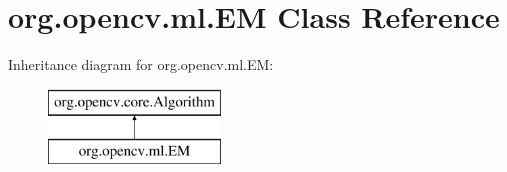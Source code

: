 \hypertarget{classorg_1_1opencv_1_1ml_1_1_e_m}{}\section{org.\+opencv.\+ml.\+EM Class Reference}
\label{classorg_1_1opencv_1_1ml_1_1_e_m}
Inheritance diagram for org.\+opencv.\+ml.\+EM\+:\begin{figure}[H]
\begin{center}
\leavevmode
\includegraphics[height=2.000000cm]{classorg_1_1opencv_1_1ml_1_1_e_m}
\end{center}
\end{figure}
